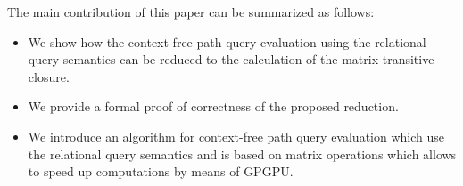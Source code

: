 \documentclass[sigconf,edbt]{acmart-edbt2018}
\begin{document}
The main contribution of this paper can be summarized as follows:
\begin{itemize}
	\item We show how the context-free path query evaluation using the relational query semantics can be reduced to the calculation of the matrix transitive closure.
	\item We provide a formal proof of correctness of the proposed reduction.
	\item We introduce an algorithm for context-free path query evaluation which use the relational query semantics and is based on matrix operations which allows to speed up computations by means of GPGPU.
\end{itemize}









 
\end{document}
